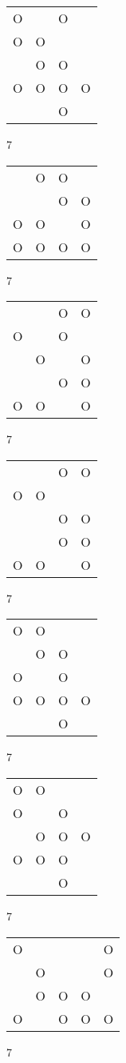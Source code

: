 \begin{tabular}{|m{0.2cm}m{0.2cm}m{0.2cm}m{0.2cm}|}\hline
O& &O& \\
O&O& & \\
 &O&O& \\
O&O&O&O\\
 & &O& \\
\hline\end{tabular}7
\begin{tabular}{|m{0.2cm}m{0.2cm}m{0.2cm}m{0.2cm}|}\hline
 &O&O& \\
 & &O&O\\
O&O& &O\\
O&O&O&O\\
\hline\end{tabular}7
\begin{tabular}{|m{0.2cm}m{0.2cm}m{0.2cm}m{0.2cm}|}\hline
 & &O&O\\
O& &O& \\
 &O& &O\\
 & &O&O\\
O&O& &O\\
\hline\end{tabular}7
\begin{tabular}{|m{0.2cm}m{0.2cm}m{0.2cm}m{0.2cm}|}\hline
 & &O&O\\
O&O& & \\
 & &O&O\\
 & &O&O\\
O&O& &O\\
\hline\end{tabular}7
\begin{tabular}{|m{0.2cm}m{0.2cm}m{0.2cm}m{0.2cm}|}\hline
O&O& & \\
 &O&O& \\
O& &O& \\
O&O&O&O\\
 & &O& \\
\hline\end{tabular}7
\begin{tabular}{|m{0.2cm}m{0.2cm}m{0.2cm}m{0.2cm}|}\hline
O&O& & \\
O& &O& \\
 &O&O&O\\
O&O&O& \\
 & &O& \\
\hline\end{tabular}7
\begin{tabular}{|m{0.2cm}m{0.2cm}m{0.2cm}m{0.2cm}m{0.2cm}|}\hline
O& & & &O\\
 &O& & &O\\
 &O&O&O& \\
O& &O&O&O\\
\hline\end{tabular}7
